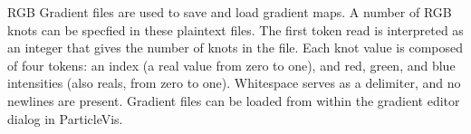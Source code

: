 RGB Gradient files are used to save and load gradient maps.  A number of RGB knots can be specfied in these plaintext files.  The first token read is interpreted as an integer that gives the number of knots in the file.  Each knot value is composed of four tokens: an index (a real value from zero to one), and red, green, and blue intensities (also reals, from zero to one).  Whitespace serves as a delimiter, and no newlines are present.  Gradient files can be loaded from within the gradient editor dialog in ParticleVis.